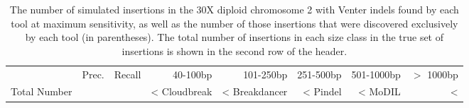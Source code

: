 \begin{table}[t]
\begin{center}
\begin{tabular}{rrr|rrrrr}
  \hline
                        & Prec. & Recall & 40-100bp  & 101-250bp  & 251-500bp & 501-1000bp & $>$ 1000bp \\ 
 Total Number &          &           & <%
  \hline
  Cloudbreak   &<%
  Breakdancer & <%
  Pindel          & <%
  MoDIL          & <%
   \hline
\end{tabular}
\end{center}
\caption{The number of simulated insertions in the 30X diploid chromosome 2 with Venter indels found by each tool at maximum sensitivity, as well as the number of those insertions that were discovered exclusively by each tool (in parentheses). The total number of insertions in each size class in the true set of insertions is shown in the second row of the header.}
\label{chr2InsertionPreds}
\end{table}
